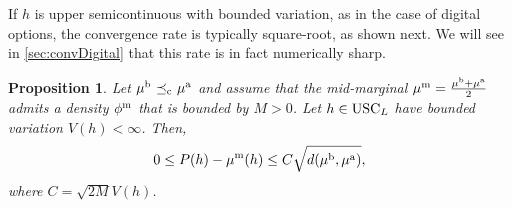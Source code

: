 \documentclass[11pt]{article}
\theoremstyle{plain}
\newtheorem{proposition}[theorem]{Proposition}
\theoremstyle{definition}
\theoremstyle{remark}
\DeclareMathOperator{\cleq}{\,\preceq_{\rm c}\,}
\theoremstyle{plain}
\begin{document}
%
%
%
%
%
%
%
%
%

%
%
%
%
%
%
%
%
%
%
%
%
%
%
%
%
%



If $h$ is upper semicontinuous with bounded variation, as in the case of digital options, the convergence rate is typically square-root, as shown next. We will see in \cref{sec:convDigital} that this rate is in fact numerically sharp.
\begin{proposition}\label{prop:USC_sqrt_rate}
Let $\mu^{\rm b} \cleq \mu^{\rm a}$ and assume that the mid-marginal $\mu^{\rm m}=\frac{\mu^{\rm b}+\mu^{\rm a}}{2}$ admits a density $\phi^{\rm m}$ that is bounded by $M>0$. 
Let $h\in{\rm USC}_L$ have bounded variation $V(h)<\infty$. 
Then, 
\[
0 \le P(h)-\mu^{\rm m}(h) \le C\sqrt{d(\mu^{\rm b},\mu^{\rm a})},
\]
where $C = \sqrt{2M} V(h)$.
%
%
%
%
%
%
%
\end{proposition}
\end{document}
